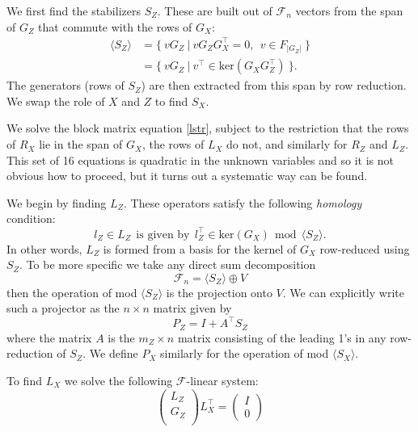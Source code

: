 \documentclass[a4paper,onecolumn,11pt,unpublished]{quantumarticle}
\newcommand{\Eref}[1]{\eqref{#1}}
\def\Span#1{\langle #1 \rangle}
\def\smbox#1{\ \ \mbox{#1}\ \ }
\newcommand{\Field}{\mathcal{F}}
\def\Ker{\mathrm{ker}}
\def\Fnd{\Field_{n}}
\newcommand\doproof{\vskip 5pt \noindent{\bf \underline{Proof:}\ }}
\begin{document}
\doproof
We first find the stabilizers $S_Z$.
These are built out of $\Fnd$ vectors from the span of $G_Z$
that commute with the rows of $G_X:$
\begin{align*}
    \Span{S_Z} &= \{\  vG_Z \ |\  v G_Z G_X^\top = 0, \ \ v \in F_{|G_Z|}\ \} \\
               &= \{\  vG_Z \ |\  v^\top \in \Ker(G_X G_Z^\top)  \ \}.
\end{align*}
The generators (rows of $S_Z$) are then extracted
from this span by row reduction.
We swap the role of $X$ and $Z$ to find $S_X.$


We solve the block matrix equation \Eref{lstr},
subject to the restriction that the rows of
$R_X$ lie in the span of $G_X$,
the rows of $L_X$ do not,
and similarly for $R_Z$ and $L_Z.$
This set of 16 equations is quadratic in the unknown variables
and so it is not obvious how to proceed, but it turns out a
systematic way can be found.

We begin by finding $L_Z.$
These operators satisfy the following \emph{homology} condition:
$$
    l_Z \in L_Z \smbox{is given by} l_Z^\top \in \Ker(G_X) \smbox{mod} \Span{S_Z}.
$$
In other words, $L_Z$ is formed from a basis for the kernel of $G_X$ 
row-reduced using $S_Z.$
To be more specific %
we take any direct sum decomposition
$$\Fnd = \Span{S_Z} \oplus V$$
then the operation of mod $\Span{S_Z}$ is the
projection onto $V.$
We can explicitly write such a 
projector as the $n\times n$
matrix given by
$$
    P_Z = I + A^\top S_Z
$$
where the matrix $A$ is the $m_Z\times n$ matrix consisting of
the leading 1's in any row-reduction of $S_Z.$
We define $P_X$ similarly for the operation of mod $\Span{S_X}.$

To find $L_X$ we solve the following $\Field$-linear
system:
$$
\left( \begin{array}{l}
L_Z\\
G_Z\\
\end{array} \right)
L_X^\top = 
\left( \begin{array}{l}
I\\
0
\end{array} \right)
$$
\end{document}
